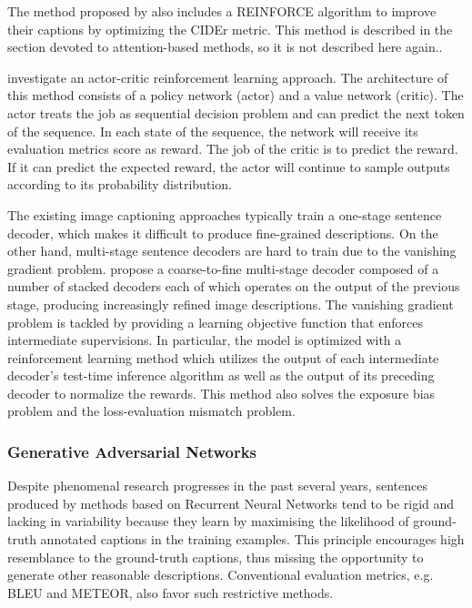 The method proposed by \citet{Li2018_VS-LSTM} also includes a REINFORCE algorithm to improve their captions by optimizing the CIDEr metric. This method is described in the section devoted to attention-based methods, so it is not described here again..

\cite{Zhang2017} investigate an actor-critic reinforcement learning \citep{Barto1983} approach. The architecture of this method consists of a policy network (actor) and a value network (critic). The actor treats the job as sequential decision problem and can predict the next token of the sequence. In each state of the sequence, the network will receive its evaluation metrics score as reward. The job of the critic is to predict the reward. If it can predict the expected reward, the actor will continue to sample outputs according to its probability distribution. 

The existing image captioning approaches typically train a one-stage sentence decoder, which makes it difficult to produce fine-grained descriptions. On the other hand, multi-stage sentence decoders are hard to train due to the vanishing gradient problem. \citet{Gu2018} propose a coarse-to-fine multi-stage decoder composed of a number of stacked decoders each of which operates on the output of the previous stage, producing increasingly refined image descriptions. The vanishing gradient problem is tackled by providing a learning objective function that enforces intermediate supervisions. In particular, the model is optimized with a reinforcement learning method which utilizes the output of each intermediate decoder’s test-time inference algorithm as well as the output of its preceding decoder to normalize the rewards. This method also solves the exposure bias problem and the loss-evaluation mismatch problem.


\subsubsection{Generative Adversarial Networks}

Despite phenomenal research progresses in the past several years, sentences produced by methods based on Recurrent Neural Networks tend to be rigid and lacking in variability because they learn by maximising the likelihood of ground-truth annotated captions in the training examples. This principle encourages high resemblance to the ground-truth captions, thus missing the opportunity to generate other reasonable descriptions. Conventional evaluation metrics, e.g. BLEU and METEOR, also favor such restrictive methods.

